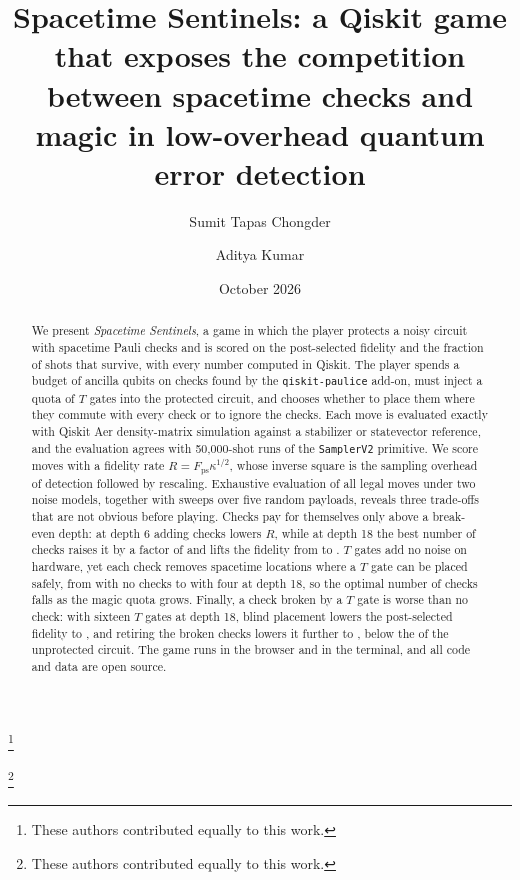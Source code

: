 \documentclass[aps,pra,twocolumn,superscriptaddress,nofootinbib,floatfix]{revtex4-2}
\begin{document}
\title{Spacetime Sentinels: a Qiskit game that exposes the competition between spacetime checks and magic in low-overhead quantum error detection}

\author{Sumit Tapas Chongder}
\thanks{These authors contributed equally to this work.}

\author{Aditya Kumar}
\thanks{These authors contributed equally to this work.}

\date{October 2026}

\begin{abstract}
We present \emph{Spacetime Sentinels}, a game in which the player protects a noisy circuit with spacetime Pauli checks and is scored on the post-selected fidelity and the fraction of shots that survive, with every number computed in Qiskit. The player spends a budget of ancilla qubits on checks found by the \texttt{qiskit-paulice} add-on, must inject a quota of $T$ gates into the protected circuit, and chooses whether to place them where they commute with every check or to ignore the checks. Each move is evaluated exactly with Qiskit Aer density-matrix simulation against a stabilizer or statevector reference, and the evaluation agrees with 50{,}000-shot runs of the \texttt{SamplerV2} primitive. We score moves with a fidelity rate $R=F_{\mathrm{ps}}\kappa^{1/2}$, whose inverse square is the sampling overhead of detection followed by rescaling. Exhaustive evaluation of all \NumMoves{} legal moves under two noise models, together with sweeps over five random payloads, reveals three trade-offs that are not obvious before playing. Checks pay for themselves only above a break-even depth: at depth 6 adding checks lowers $R$, while at depth 18 the best number of checks raises it by a factor of \EoneGainDeep{} and lifts the fidelity from \EoneFzeroDeep{} to \EoneFpsDeep. $T$ gates add no noise on hardware, yet each check removes spacetime locations where a $T$ gate can be placed safely, from \CapDeepZero{} with no checks to \CapDeepFour{} with four at depth 18, so the optimal number of checks falls as the magic quota grows. Finally, a check broken by a $T$ gate is worse than no check: with sixteen $T$ gates at depth 18, blind placement lowers the post-selected fidelity to \EtwoBlindFDeepTSixteen, and retiring the broken checks lowers it further to \EtwoRetireFDeepTSixteen, below the \EtwoNoneFDeepTSixteen{} of the unprotected circuit. The game runs in the browser and in the terminal, and all code and data are open source.
\end{abstract}

\maketitle









\end{document}
